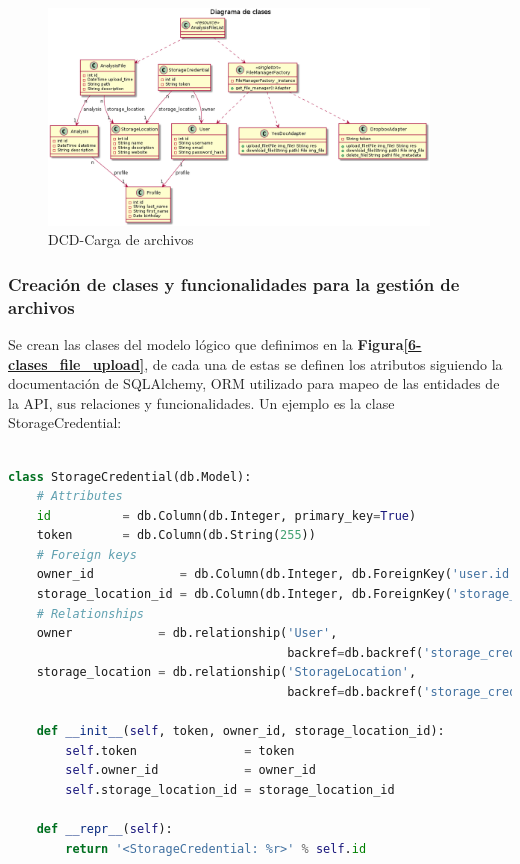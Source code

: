\documentclass[a4paper,12pt]{article}
\begin{document}
	\begin{figure}[h]
        \centering
        \includegraphics[width=0.9\textwidth]{img/dcd_file_upload}
        \caption{DCD-Carga de archivos}
		\label{6-dcd_file_upload}
    \end{figure}

\subsubsection{Creación de clases y funcionalidades para la gestión de archivos}

Se crean las clases del modelo lógico que definimos en la \textbf{Figura\ref{6-clases_file_upload}}, de cada una de estas se definen los atributos siguiendo la documentación de SQLAlchemy, ORM utilizado para mapeo de las entidades de la API, sus relaciones y funcionalidades. Un ejemplo es la clase StorageCredential:
\begin{lstlisting}[language=Python]

class StorageCredential(db.Model):
    # Attributes
    id          = db.Column(db.Integer, primary_key=True)
    token       = db.Column(db.String(255))
    # Foreign keys
    owner_id            = db.Column(db.Integer, db.ForeignKey('user.id'))
    storage_location_id = db.Column(db.Integer, db.ForeignKey('storage_location.id'))
    # Relationships
    owner            = db.relationship('User',
                                       backref=db.backref('storage_credentials', lazy='dynamic'))
    storage_location = db.relationship('StorageLocation',
                                       backref=db.backref('storage_credentials', lazy='dynamic'))

    def __init__(self, token, owner_id, storage_location_id):
        self.token               = token
        self.owner_id            = owner_id
        self.storage_location_id = storage_location_id

    def __repr__(self):
        return '<StorageCredential: %r>' % self.id
\end{lstlisting}
\end{document}
